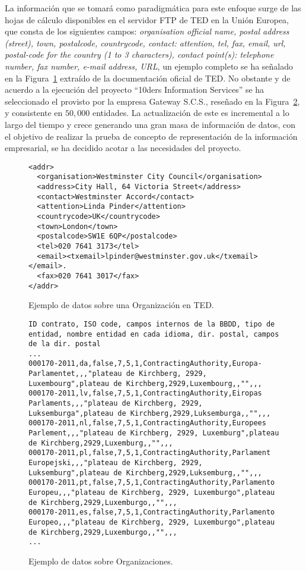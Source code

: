 La información que se tomará como paradigmática para este enfoque surge de las hojas de cálculo disponibles en el servidor 
\gls{FTP} de \gls{TED} en la Unión Europea, que consta de los siguientes campos: \textit{organisation official name, postal address (street), town, 
postalcode, countrycode, contact: attention, tel, fax, email, url, postal-code for the country (1 to 3 characters), contact point(s): telephone number, 
fax number, e-mail address, \gls{URL}}, un ejemplo completo se ha señalado en la Figura~\ref{fig:orgs-example-ted} extraído 
de la documentación oficial de TED. No obstante y de acuerdo a la ejecución del proyecto ``10ders Information Services'' se ha seleccionado 
el \dataset provisto por la empresa Gateway S.C.S., reseñado en la Figura~\ref{fig:orgs-example}, y consistente en $50,000$ entidades. La actualización 
de este \dataset es incremental a lo largo del tiempo y crece generando una gran masa de información de datos, con el objetivo de realizar la prueba 
de concepto de representación de la información empresarial, se ha decidido acotar a las necesidades del proyecto.

\begin{figure}[!htp]
\begin{lstlisting} 
<addr>
  <organisation>Westminster City Council</organisation>
  <address>City Hall, 64 Victoria Street</address>
  <contact>Westminster Accord</contact>
  <attention>Linda Pinder</attention>
  <countrycode>UK</countrycode>
  <town>London</town>
  <postalcode>SW1E 6QP</postalcode>
  <tel>020 7641 3173</tel>
  <email><txemail>lpinder@westminster.gov.uk</txemail></email>.
  <fax>020 7641 3017</fax>
</addr>
\end{lstlisting}
	\caption{Ejemplo de datos sobre una Organización en TED.}
	\label{fig:orgs-example-ted}
\end{figure}


\begin{figure}[!htp]
\begin{lstlisting} 
ID contrato, ISO code, campos internos de la BBDD, tipo de entidad, nombre entidad en cada idioma, dir. postal, campos de la dir. postal
...
000170-2011,da,false,7,5,1,ContractingAuthority,Europa-Parlamentet,,,"plateau de Kirchberg, 2929, Luxembourg",plateau de Kirchberg,2929,Luxembourg,,"",,,
000170-2011,lv,false,7,5,1,ContractingAuthority,Eiropas Parlaments,,,"plateau de Kirchberg, 2929, Luksemburga",plateau de Kirchberg,2929,Luksemburga,,"",,,
000170-2011,nl,false,7,5,1,ContractingAuthority,Europees Parlement,,,"plateau de Kirchberg, 2929, Luxemburg",plateau de Kirchberg,2929,Luxemburg,,"",,,
000170-2011,pl,false,7,5,1,ContractingAuthority,Parlament Europejski,,,"plateau de Kirchberg, 2929, Luksemburg",plateau de Kirchberg,2929,Luksemburg,,"",,,
000170-2011,pt,false,7,5,1,ContractingAuthority,Parlamento Europeu,,,"plateau de Kirchberg, 2929, Luxemburgo",plateau de Kirchberg,2929,Luxemburgo,,"",,,
000170-2011,es,false,7,5,1,ContractingAuthority,Parlamento Europeo,,,"plateau de Kirchberg, 2929, Luxemburgo",plateau de Kirchberg,2929,Luxemburgo,,"",,,
...
\end{lstlisting}
	\caption{Ejemplo de datos sobre Organizaciones.}
	\label{fig:orgs-example}
\end{figure}


